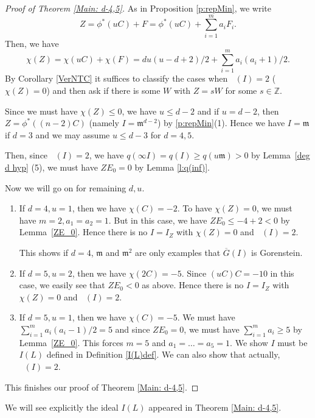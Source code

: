 \documentclass[12pt]{amsart}
\theoremstyle{definition}
\theoremstyle{remark}
\numberwithin{equation}{section}
\newcommand{\lemref}[1]{Lemma~\ref{#1}}
\DeclareMathOperator{\br}{\bar r}
\newcommand{\m}{\mathfrak m}
\newcommand{\bbZ}{\ensuremath{\mathbb Z}}
\renewcommand{\:}{\colon}
\begin{document}
\begin{proof}[Proof of Theorem \ref{Main: d-4,5}] 
As in Proposition \ref{p:repMin}, we write 
\[Z = \phi^*(u C) + F = \phi^*( u C) + \sum_{i=1}^m a_i F_i.\]
Then, we have 
\begin{equation}
\label{eq:chi}
\chi(Z) = \chi(uC) + \chi( F ) = du (u - d + 2 ) / 2 + \sum_{i=1}^m a_i(a_i+1)/2.\end{equation}
By Corollary \ref{VerNTC} it suffices to classify the cases when $\br(I) =2$
 ($\chi(Z) = 0$) and then ask if there is some $W$ with $Z = sW$ for some $s \in \bbZ$. 
\par 
Since we must have $\chi(Z) \le 0$, we have $u \le d-2$ and 
if $u = d-2$, then $Z = \phi^*((n-2)C)$ (namely $I = \m^{d-2}$) by \ref{p:repMin}(1). 
Hence we have $I = \m$ if $d=3$ and we may assume $u \le d-3$ for $d = 4,5$. 
\par
Then, since $\br(I)=2$, we have $q( \infty I) = q(I) \ge q(u \m)  >0$ by \lemref{deg d hyp}  (5), 
we must have 
$Z E_0=0$ by  Lemma \ref{l:q(inf)}. 
\par 
Now we will go on for remaining $d, u$.

\begin{enumerate}
\item If $d=4, u=1$, then we have $\chi(C) = -2$. To have $\chi(Z)=0$, 
we must have $m=2, a_1=a_2=1$. But in this case, we have $Z E_0 \le 
- 4 + 2 < 0$  by \lemref{ZE_0}. Hence there is no $I=I_Z$ with $\chi(Z) =0$ and $\br(I)=2$.    
\par 
This shows if $d=4$, $\m$ and $\m^2$ are only examples that $\overline{G}(I)$ is Gorenstein.  

\item If $d =5, u = 2$, then we have $\chi(2C) = -5$. Since $(uC)C = -10$ in this case, 
we easily see that $Z E_0 < 0$   as above. Hence there is  no $I=I_Z$ with $\chi(Z) =0$ and $\br(I)=2$.   
\item If $d=5, u=1$, then we have $\chi(C) = -5$. We must have $\sum_{i=1}^m a_i(a_i-1)/2 = 5$
and since $Z  E_0=0$, we must have $\sum_{i=1}^m a_i\ge 5$  by \lemref{ZE_0}. This forces 
$m=5$ and $a_1=\ldots =a_5=1$. We show $I$ must be $I(L)$ defined in Definition \ref{I(L)def}. 
We can also show that actually, $\br(I)=2$.  
\end{enumerate}
This finishes our proof of Theorem \ref{Main: d-4,5}.
\end{proof} 
 

We will see explicitly the ideal $I(L)$ appeared in Theorem \ref{Main: d-4,5}.
\end{document}

